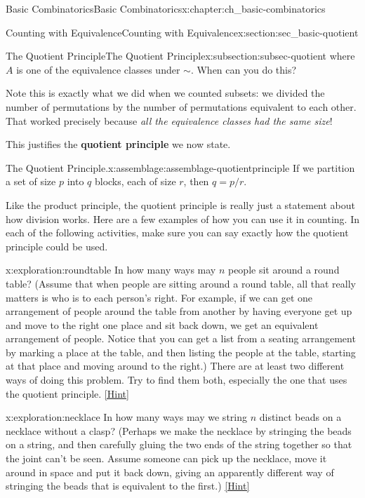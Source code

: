 \documentclass[oneside,10pt,]{book}
\newcommand{\terminology}[1]{\textbf{#1}}
\numberwithin{equation}{chapter}
\begin{document}
\begin{chapterptx}{Basic Combinatorics}{}{Basic Combinatorics}{}{}{x:chapter:ch_basic-combinatorics}
\begin{sectionptx}{Counting with Equivalence}{}{Counting with Equivalence}{}{}{x:section:sec_basic-quotient}
\begin{subsectionptx}{The Quotient Principle}{}{The Quotient Principle}{}{}{x:subsection:subsec-quotient}
where \(A\) is one of the equivalence classes under \(\sim\).  When can you do this?%
\par
Note this is exactly what we did when we counted subsets: we divided the number of permutations by the number of permutations equivalent to each other.  That worked precisely because \emph{all the equivalence classes had the same size}!%
\par
This justifies the \terminology{quotient principle} we now state.%
\begin{assemblage}{The Quotient Principle.}{x:assemblage:assemblage-quotientprinciple}%
If we partition a set of size \(p\) into \(q\) blocks, each of size \(r\), then \(q = p/r\).%
\end{assemblage}
Like the product principle, the quotient principle is really just a statement about how division works.  Here are a few examples of how you can use it in counting.  In each of the following activities, make sure you can say exactly how the quotient principle could be used.%
\begin{exploration}{}{x:exploration:roundtable}%
In how many ways may \(n\) people sit around a round table? (Assume that when people are sitting around a round table, all that really matters is who is to each person's right. For example, if we can get one arrangement of people around the table from another by having everyone get up and move to the right one place and sit back down, we get an equivalent arrangement of people. Notice that you can get a list from a seating arrangement by marking a place at the table, and then listing the people at the table, starting at that place and moving around to the right.) There are at least two different ways of doing this problem. Try to find them both, especially the one that uses the quotient principle.%
\space\hspace*{0pt}\hfill{\tiny\hyperlink{g:hint:idm1909-back}{[Hint]}}\end{exploration}
\begin{exploration}{}{x:exploration:necklace}%
In how many ways may we string \(n\) distinct beads on a necklace without a clasp? (Perhaps we make the necklace by stringing the beads on a string, and then carefully gluing the two ends of the string together so that the joint can't be seen. Assume someone can pick up the necklace, move it around in space and put it back down, giving an apparently different way of stringing the beads that is equivalent to the first.)%
\space\hspace*{0pt}\hfill{\tiny\hyperlink{g:hint:idm1930-back}{[Hint]}}\end{exploration}

\end{subsectionptx}
\end{sectionptx}
\end{chapterptx}
\end{document}
